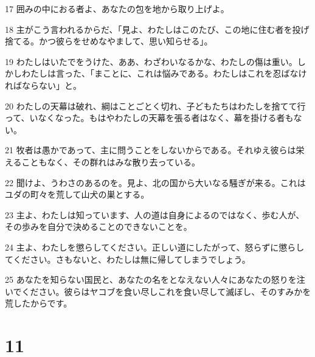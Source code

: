 \par 17 囲みの中におる者よ、あなたの包を地から取り上げよ。
\par 18 主がこう言われるからだ、「見よ、わたしはこのたび、この地に住む者を投げ捨てる。かつ彼らをせめなやまして、思い知らせる」。
\par 19 わたしはいたでをうけた、ああ、わざわいなるかな、わたしの傷は重い。しかしわたしは言った、「まことに、これは悩みである。わたしはこれを忍ばなければならない」と。
\par 20 わたしの天幕は破れ、綱はことごとく切れ、子どもたちはわたしを捨てて行って、いなくなった。もはやわたしの天幕を張る者はなく、幕を掛ける者もない。
\par 21 牧者は愚かであって、主に問うことをしないからである。それゆえ彼らは栄えることもなく、その群れはみな散り去っている。
\par 22 聞けよ、うわさのあるのを。見よ、北の国から大いなる騒ぎが来る。これはユダの町々を荒して山犬の巣とする。
\par 23 主よ、わたしは知っています、人の道は自身によるのではなく、歩む人が、その歩みを自分で決めることのできないことを。
\par 24 主よ、わたしを懲らしてください。正しい道にしたがって、怒らずに懲らしてください。さもないと、わたしは無に帰してしまうでしょう。
\par 25 あなたを知らない国民と、あなたの名をとなえない人々にあなたの怒りを注いでください。彼らはヤコブを食い尽しこれを食い尽して滅ぼし、そのすみかを荒したからです。

\chapter{11}

